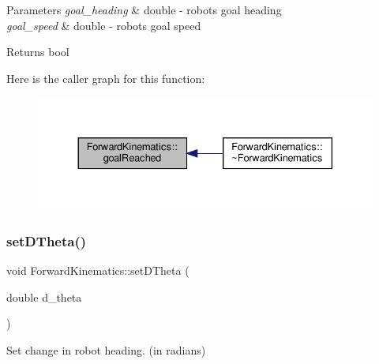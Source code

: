\begin{DoxyParams}{Parameters}
{\em goal\+\_\+heading} & double -\/ robot\textquotesingle{}s goal heading \\
\hline
{\em goal\+\_\+speed} & double -\/ robot\textquotesingle{}s goal speed \\
\hline
\end{DoxyParams}
\begin{DoxyReturn}{Returns}
bool 
\end{DoxyReturn}
Here is the caller graph for this function\+:
\nopagebreak
\begin{figure}[H]
\begin{center}
\leavevmode
\includegraphics[width=330pt]{classForwardKinematics_ab5b26d5bc5c63148a7efa8361a851066_icgraph}
\end{center}
\end{figure}
\mbox{\label{classForwardKinematics_ad4093b156610a520068844c7018a256e}} 
\subsubsection{\texorpdfstring{set\+D\+Theta()}{setDTheta()}}
{\footnotesize\ttfamily void Forward\+Kinematics\+::set\+D\+Theta (\begin{DoxyParamCaption}\item[{double}]{d\+\_\+theta }\end{DoxyParamCaption})}



Set change in robot heading. (in radians) 


